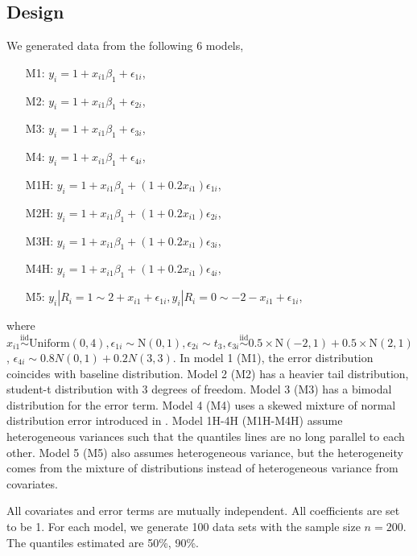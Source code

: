 \documentclass[12pt]{article}
\begin{document}
\subsection{Design}
We generated data from the following 6 models,
\begin{itemize}
\item [M1:] $y_i = 1 + x_{i1}\beta_1 + \epsilon_{1i}$,
\item [M2:] $y_i = 1 + x_{i1}\beta_1 + \epsilon_{2i}$,
\item [M3:] $y_i = 1 + x_{i1}\beta_1 + \epsilon_{3i}$,
\item [M4:] $y_i = 1 + x_{i1}\beta_1 + \epsilon_{4i}$,
\item [M1H:] $y_i = 1 + x_{i1}\beta_1 + (1 + 0.2x_{i1})
  \epsilon_{1i}$,
\item [M2H:] $y_i = 1 + x_{i1}\beta_1 + (1 + 0.2x_{i1})
  \epsilon_{2i}$,
\item [M3H:] $y_i = 1 + x_{i1}\beta_1 + (1 + 0.2x_{i1})
  \epsilon_{3i}$,
\item [M4H:] $y_i = 1 + x_{i1}\beta_1 + (1 + 0.2x_{i1})
  \epsilon_{4i}$,
\item [M5:] $y_{i} | R_i = 1 \sim 2 + x_{i1} + \epsilon_{1i}, y_{i}|
  R_i = 0 \sim -2 - x_{i1} + \epsilon_{1i}$,
\end{itemize}
where $x_{i1} \stackrel{\mbox{iid}}{\sim} \mathrm{Uniform}(0,4),
\epsilon_{1i} \sim \mathrm{N}(0,1), \epsilon_{2i} \sim t_3,
\epsilon_{3i} \stackrel{\mbox{iid}}{\sim} 0.5 \times \mathrm{N}(-2,1)
+ 0.5 \times \mathrm{N}(2,1)$, $\epsilon_{4i} \sim 0.8 N(0,1) + 0.2
N(3,3)$. In model 1 (M1), the
error distribution coincides with baseline distribution. Model 2 (M2)
has a heavier tail distribution, student-t distribution with 3 degrees
of freedom. Model 3 (M3) has a bimodal distribution for the error
term.  Model 4 (M4) uses a skewed mixture of normal distribution error
introduced in \citet{reich2010}. Model 1H-4H (M1H-M4H) assume
heterogeneous variances such that the quantiles lines are no long
parallel to each other. Model 5 (M5) also assumes heterogeneous variance,
but the heterogeneity comes from the mixture of distributions
instead of heterogeneous variance from covariates.

All covariates and error terms are mutually independent. All
coefficients are set to be 1. For each model, we generate 100 data
sets with the sample size $n=200$. The quantiles estimated are 50\%,
90\%.
\end{document}
